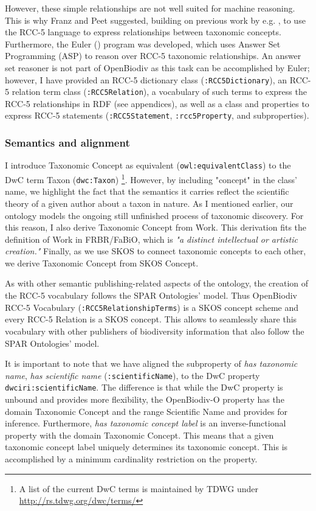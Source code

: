 However, these simple relationships are not well suited for machine reasoning. This is why Franz and Peet \cite{franz_perspectives:_2009} suggested, building on previous work by e.g. \cite{koperski_referenzliste_2000}, to use the RCC-5 language to express relationships between taxonomic concepts. Furthermore, the Euler (\cite{chen_euler/x:_2014}) program was developed, which uses Answer Set Programming (ASP) to reason over RCC-5 taxonomic relationships. An answer set reasoner is not part of  OpenBiodiv as this task can be accomplished by Euler; however, I have provided an RCC-5 dictionary class ({\tt :RCC5Dictionary}), an RCC-5 relation term class ({\tt :RCC5Relation}), a vocabulary of such terms to express the RCC-5 relationships in RDF (see appendices), as well as a class and properties to express RCC-5 statements ({\tt :RCC5Statement}, {\tt :rcc5Property}, and subproperties). 

\subsubsection{Semantics and alignment}

I introduce Taxonomic Concept as equivalent ({\tt owl:equivalentClass}) to the DwC term Taxon ({\tt dwc:Taxon}) \footnote{A list of the current DwC terms is maintained by TDWG under \url{http://rs.tdwg.org/dwc/terms/}}. However, by including "concept" in the class' name, we highlight the fact that the semantics it carries reflect the scientific theory of a given author about a taxon in nature. As I mentioned earlier, our ontology models the ongoing still unfinished process of taxonomic discovery. For this reason, I also derive Taxonomic Concept from Work. This derivation fits the definition of Work in FRBR/FaBiO, which is \emph{"a distinct intellectual or artistic creation."} Finally, as we use SKOS to connect taxonomic concepts to each other, we derive Taxonomic Concept from SKOS Concept.

As with other semantic publishing-related aspects of the ontology, the creation of the RCC-5 vocabulary follows the SPAR Ontologies' model. Thus OpenBiodiv RCC-5 Vocabulary ({\tt :RCC5RelationshipTerms}) is a SKOS concept scheme and every RCC-5 Relation is a SKOS concept. This allows to seamlessly share this vocabulary with other publishers of biodiversity information that also follow the SPAR Ontologies' model.

It is important to note that we have aligned the subproperty of \emph{has taxonomic name}, \emph{has scientific name} ({\tt :scientificName}), to the DwC property {\tt dwciri:scientificName}. The difference is that while the DwC property is unbound and provides more flexibility, the \mbox{OpenBiodiv-O} property has the domain Taxonomic Concept and the range Scientific Name and provides for inference. Furthermore, \emph{has taxonomic concept label} is an inverse-functional property with the domain Taxonomic Concept. This means that a given taxonomic concept label uniquely determines its taxonomic concept. This is accomplished by a minimum cardinality restriction on the property.

